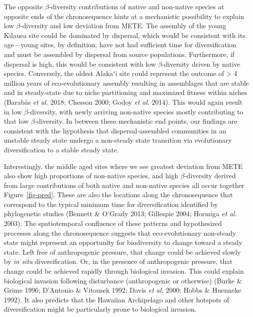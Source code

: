 \documentclass[
  letterpaper,
  DIV=11,
  numbers=noendperiod]{scrartcl}
\begin{document}
The opposite \(\beta\)-diversity contributions of native and non-native
species at opposite ends of the chronosequence hints at a mechanistic
possibility to explain low \(\beta\)-diversity and low deviation from
METE. The assembly of the young Kīlauea site could be dominated by
dispersal, which would be consistent with its age---young sites, by
definition, have not had sufficient time for diversification and must be
assembled by dispersal from source populations. Furthermore, if
dispersal is high, this would be consistent with low \(\beta\)-diversity
driven by native species. Conversely, the oldest Alakaʻi site could
represent the outcome of \textgreater{} 4 million years of
eco-evolutionary assembly resulting in assemblages that are stable and
in steady-state due to niche partitioning and maximized fitness within
niches (Barabás \emph{et al.} 2018; Chesson 2000; Godoy \emph{et al.}
2014). This would again result in low \(\beta\)-diversity, with newly
arriving non-native species mostly contributing to that low
\(\beta\)-diversity. In between these mechanistic end points, our
findings are consistent with the hypothesis that dispersal-assembled
communities in an unstable steady state undergo a non-steady state
transition via evolutionary diversification to a stable steady state.

Interestingly, the middle aged sites where we see greatest deviation
from METE also show high proportions of non-native species, and high
\(\beta\)-diversity derived from large contributions of both native and
non-native species all occur together Figure~\ref{fig-pred}. These are
also the locations along the chronosequence that correspond to the
typical minimum time for diversification identified by phylogenetic
studies (Bennett \& O'Grady 2013; Gillespie 2004; Hormiga \emph{et al.}
2003). The spatiotemporal confluence of these patterns and hypothesized
processes along the chronosequence suggests that eco-evolutionary
non-steady state might represent an opportunity for biodiversity to
change toward a steady state. Left free of anthropogenic pressure, that
change could be achieved slowly by \emph{in situ} diversification. Or,
in the presence of anthropogenic pressure, that change could be achieved
rapidly through biological invasion. This could explain biological
invasion following disturbance (anthropogenic or otherwise) (Burke \&
Grime 1996; D'Antonio \& Vitousek 1992; Davis \emph{et al.} 2000; Hobbs
\& Huenneke 1992). It also predicts that the Hawaiian Archipelago and
other hotspots of diversification might be particularly prone to
biological invasion.
\end{document}
